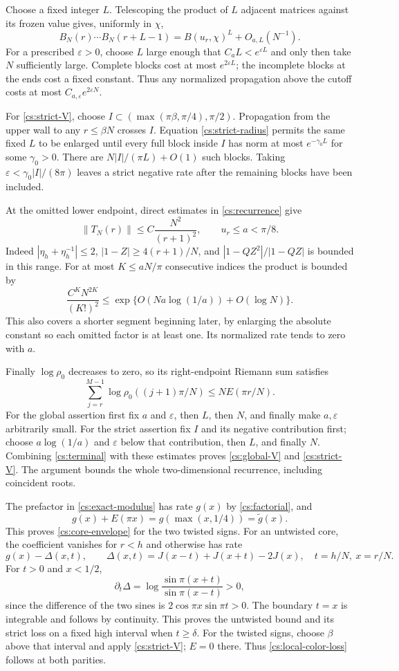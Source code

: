 Choose a fixed integer $L$. Telescoping the product of $L$ adjacent matrices against its frozen value gives, uniformly in $\chi$,
\[
 B_N(r)\cdots B_N(r+L-1)
 =B(u_r,\chi)^L+O_{a,L}(N^{-1}).
\]
For a prescribed $\varepsilon>0$, choose $L$ large enough that $C_aL<e^{\varepsilon L}$ and only then take $N$ sufficiently large. Complete blocks cost at most $e^{2\varepsilon L}$; the incomplete blocks at the ends cost a fixed constant. Thus any normalized propagation above the cutoff costs at most $C_{a,\varepsilon}e^{2\varepsilon N}$.

For \eqref{cs:strict-V}, choose
$I\subset(\max(\pi\beta,\pi/4),\pi/2)$. Propagation from the upper wall to any $r\le\beta N$ crosses $I$. Equation \eqref{cs:strict-radius} permits the same fixed $L$ to be enlarged until every full block inside $I$ has norm at most $e^{-\gamma_0 L}$ for some $\gamma_0>0$. There are $N|I|/(\pi L)+O(1)$ such blocks. Taking $\varepsilon<\gamma_0|I|/(8\pi)$ leaves a strict negative rate after the remaining blocks have been included.

At the omitted lower endpoint, direct estimates in \eqref{cs:recurrence} give
\[
 \|T_N(r)\|\le C\frac{N^2}{(r+1)^2},\qquad u_r\le a<\pi/8.
\]
Indeed $|\eta_h+\eta_h^{-1}|\le2$, $|1-Z|\ge4(r+1)/N$, and
$|1-QZ^2|/|1-QZ|$ is bounded in this range. For at most $K\le aN/\pi$ consecutive indices the product is bounded by
\[
 \frac{C^KN^{2K}}{(K!)^2}
 \le\exp\{O(Na\log(1/a))+O(\log N)\}.
\]
This also covers a shorter segment beginning later, by enlarging the absolute constant so each omitted factor is at least one. Its normalized rate tends to zero with $a$.

Finally $\log\rho_0$ decreases to zero, so its right-endpoint Riemann sum satisfies
\[
 \sum_{j=r}^{M-1}\log\rho_0((j+1)\pi/N)\le NE(\pi r/N).
\]
For the global assertion first fix $a$ and $\varepsilon$, then $L$, then $N$, and finally make $a,\varepsilon$ arbitrarily small. For the strict assertion fix $I$ and its negative contribution first; choose $a\log(1/a)$ and $\varepsilon$ below that contribution, then $L$, and finally $N$. Combining \eqref{cs:terminal} with these estimates proves \eqref{cs:global-V} and \eqref{cs:strict-V}. The argument bounds the whole two-dimensional recurrence, including coincident roots.

The prefactor in \eqref{cs:exact-modulus} has rate $g(x)$ by \eqref{cs:factorial}, and
\begin{equation}\label{cs:plateau}
 g(x)+E(\pi x)=g(\max(x,1/4))=\widetilde g(x).
\end{equation}
This proves \eqref{cs:core-envelope} for the two twisted signs. For an untwisted core, the coefficient vanishes for $r<h$ and otherwise has rate
\[
 g(x)-\Delta(x,t),\qquad
 \Delta(x,t)=J(x-t)+J(x+t)-2J(x),
 \quad t=h/N,\ x=r/N.
\]
For $t>0$ and $x<1/2$,
\[
 \partial_t\Delta=\log\frac{\sin\pi(x+t)}{\sin\pi(x-t)}>0,
\]
since the difference of the two sines is $2\cos\pi x\sin\pi t>0$. The boundary $t=x$ is integrable and follows by continuity. This proves the untwisted bound and its strict loss on a fixed high interval when $t\ge\delta$. For the twisted signs, choose $\beta$ above that interval and apply \eqref{cs:strict-V}; $E=0$ there. Thus \eqref{cs:local-color-loss} follows at both parities.

